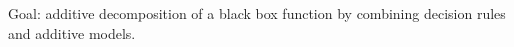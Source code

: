 Goal: additive decomposition of a black box function by combining decision rules and additive models.